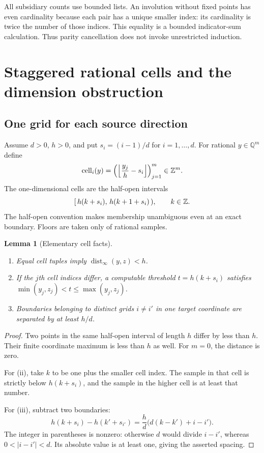 \documentclass[11pt,a4paper]{article}
\newtheorem{lemma}[theorem]{Lemma}
\theoremstyle{definition}
\newcommand{\Q}{\mathbb Q}\newcommand{\R}{\mathbb R}
\newcommand{\dist}{\operatorname{dist}_{\infty}}
\newcommand{\Cell}{\operatorname{cell}}
\newcommand{\floor}[1]{\left\lfloor #1\right\rfloor}
\begin{document}
All subsidiary counts use bounded lists. An involution without
fixed points has even cardinality because each pair has a unique
smaller index: its cardinality is twice the number of those indices.
This equality is a bounded indicator-sum calculation. Thus parity
cancellation does not invoke unrestricted induction.

\section{Staggered rational cells and the dimension obstruction}
\subsection{One grid for each source direction}
Assume $d>0$, $h>0$, and put $s_i=(i-1)/d$ for $i=1,\ldots,d$.
For rational $y\in\Q^m$ define
\begin{equation}\label{eq:cell}
 \Cell_i(y)=
 \left(\floor{\frac{y_j}{h}-s_i}\right)_{j=1}^{m}\in\Z^m.
\end{equation}
The one-dimensional cells are the half-open intervals
\[
        [\,h(k+s_i),\,h(k+1+s_i)\,),\qquad k\in\mathbb Z.
\]
The half-open convention makes membership unambiguous even at
an exact boundary. Floors are taken only of rational samples.

\begin{lemma}[Elementary cell facts]\label{lem:cells}
\leavevmode
\begin{enumerate}[label=\textup{(\roman*)}]
\item Equal cell tuples imply $\dist(y,z)<h$.
\item If the $j$th cell indices differ, a computable threshold
$t=h(k+s_i)$ satisfies
$\min(y_j,z_j)<t\leq\max(y_j,z_j)$.
\item Boundaries belonging to distinct grids $i\ne i'$ in one
target coordinate are separated by at least $h/d$.
\end{enumerate}
\end{lemma}
\begin{proof}
Two points in the same half-open interval of length $h$ differ
by less than $h$. Their finite coordinate maximum is less than
$h$ as well. For $m=0$, the distance is zero.

For (ii), take $k$ to be one plus the smaller cell index.
The sample in that cell is strictly below $h(k+s_i)$, and
the sample in the higher cell is at least that number.

For (iii), subtract two boundaries:
\begin{equation}\label{eq:latticegap}
 h(k+s_i)-h(k'+s_{i'})
       =\frac hd\bigl(d(k-k')+i-i'\bigr).
\end{equation}
The integer in parentheses is nonzero: otherwise $d$ would
divide $i-i'$, whereas $0<|i-i'|<d$. Its absolute value is
at least one, giving the asserted spacing.
\end{proof}
\end{document}
